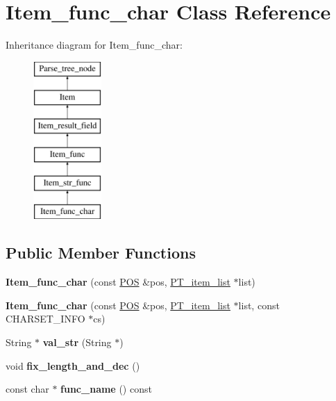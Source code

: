\hypertarget{classItem__func__char}{}\section{Item\+\_\+func\+\_\+char Class Reference}
\label{classItem__func__char}
Inheritance diagram for Item\+\_\+func\+\_\+char\+:\begin{figure}[H]
\begin{center}
\leavevmode
\includegraphics[height=6.000000cm]{classItem__func__char}
\end{center}
\end{figure}
\subsection*{Public Member Functions}
\begin{DoxyCompactItemize}
\item 
\mbox{\label{classItem__func__char_a15620ebfe1840c6326e895ed94ab5233}} 
{\bfseries Item\+\_\+func\+\_\+char} (const \mbox{\hyperlink{structYYLTYPE}{P\+OS}} \&pos, \mbox{\hyperlink{classPT__item__list}{P\+T\+\_\+item\+\_\+list}} $\ast$list)
\item 
\mbox{\label{classItem__func__char_a739135a25ae59ebee4453a976cd5ae14}} 
{\bfseries Item\+\_\+func\+\_\+char} (const \mbox{\hyperlink{structYYLTYPE}{P\+OS}} \&pos, \mbox{\hyperlink{classPT__item__list}{P\+T\+\_\+item\+\_\+list}} $\ast$list, const C\+H\+A\+R\+S\+E\+T\+\_\+\+I\+N\+FO $\ast$cs)
\item 
\mbox{\label{classItem__func__char_acc34fa6a7bf875650c78c5f61996fb96}} 
String $\ast$ {\bfseries val\+\_\+str} (String $\ast$)
\item 
\mbox{\label{classItem__func__char_a153ffb752864023ea5ef16ca53828c47}} 
void {\bfseries fix\+\_\+length\+\_\+and\+\_\+dec} ()
\item 
\mbox{\label{classItem__func__char_a956c44dc0cc78161524b83c1ed12e6ce}} 
const char $\ast$ {\bfseries func\+\_\+name} () const
\end{DoxyCompactItemize}
